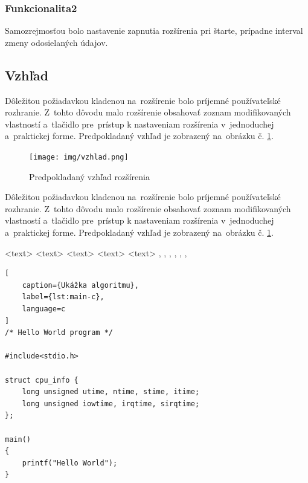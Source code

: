 \subsubsection{Funkcionalita2}
\noindent Samozrejmosťou bolo nastavenie zapnutia rozšírenia pri štarte, prípadne interval zmeny odosielaných údajov.

\subsection{Vzhľad}
\noindent Dôležitou požiadavkou kladenou na~rozšírenie bolo príjemné používateľské rozhranie. Z~tohto dôvodu malo rozšírenie obsahovať zoznam modifikovaných vlastností a~tlačidlo pre~prístup k nastaveniam rozšírenia v~jednoduchej a~praktickej forme. Predpokladaný vzhľad je zobrazený na~obrázku č. \ref{vzhladobr}.
\begin{figure}[!htbp]
	\centering
	\texttt{[image: img/vzhlad.png]}
	\caption{Predpokladaný vzhľad rozšírenia}
	\label{vzhladobr}
\end{figure}
\noindent Dôležitou požiadavkou kladenou na~rozšírenie bolo príjemné používateľské rozhranie.\cite{t00} Z~tohto dôvodu malo rozšírenie obsahovať zoznam modifikovaných vlastností a~tlačidlo pre~prístup k nastaveniam rozšírenia v~jednoduchej a~praktickej forme. Predpokladaný vzhľad je zobrazený na~obrázku č. \ref{vzhladobr}.

\begin{algorithm}
\scriptsize
\begin{algorithmic}
	\STATE <text>
	  \ELSE {} \ENDIF
	    \ENDIF
	  \ENDFOR
	  \ENDFOR
	  \ENDFOR
	  \ENDWHILE
	\REPEAT {} 
	\LOOP {} \ENDLOOP
	\REQUIRE <text>
	\ENSURE <text>
	\RETURN <text>
	\PRINT <text>
	\AND, \OR, \XOR, \NOT, \TO, \TRUE, \FALSE
\end{algorithmic}
\caption{Ukážka príkazov pre~algorithmic}
\label{alg:preview}
\end{algorithm}

\begin{lstlisting}[
	caption={Ukážka algoritmu},
	label={lst:main-c},
	language=c
]
/* Hello World program */

#include<stdio.h>

struct cpu_info {
	long unsigned utime, ntime, stime, itime;
	long unsigned iowtime, irqtime, sirqtime;
};

main()
{
	printf("Hello World");
}
\end{lstlisting}

